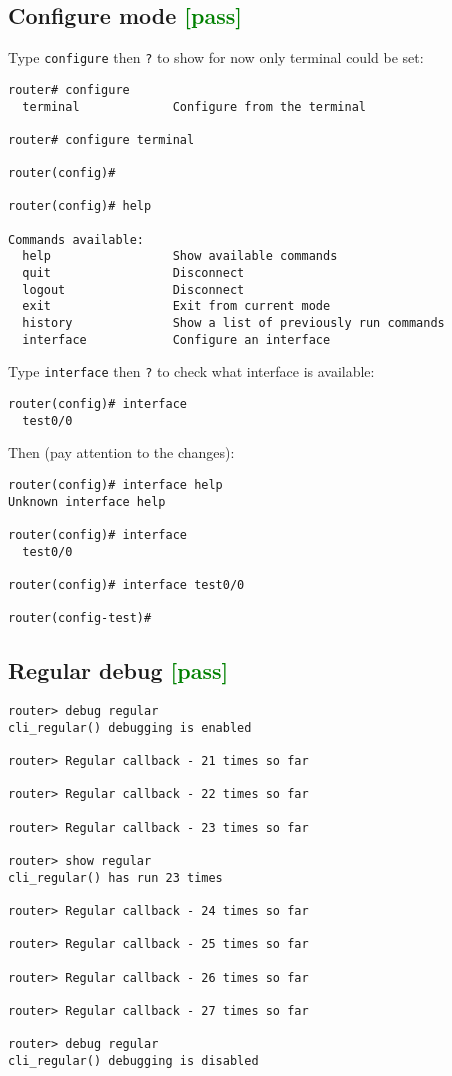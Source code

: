 \documentclass[a4paper]{report}
\begin{document}
\subsection{Configure mode \textcolor{green}{[pass]}}
Type {\tt configure} then {\tt ?} to show for now only terminal could be set:
\begin{lstlisting}
router# configure 
  terminal             Configure from the terminal

router# configure terminal

router(config)# 

router(config)# help

Commands available:
  help                 Show available commands
  quit                 Disconnect
  logout               Disconnect
  exit                 Exit from current mode
  history              Show a list of previously run commands
  interface            Configure an interface
\end{lstlisting}
Type {\tt interface} then {\tt ?} to check what interface is available:
\begin{lstlisting}
router(config)# interface 
  test0/0
\end{lstlisting}
Then (pay attention to the changes):
\begin{lstlisting}
router(config)# interface help
Unknown interface help

router(config)# interface 
  test0/0

router(config)# interface test0/0

router(config-test)# 
\end{lstlisting}
\subsection{Regular debug \textcolor{green}{[pass]}}
\begin{lstlisting}
router> debug regular
cli_regular() debugging is enabled

router> Regular callback - 21 times so far

router> Regular callback - 22 times so far

router> Regular callback - 23 times so far

router> show regular
cli_regular() has run 23 times

router> Regular callback - 24 times so far

router> Regular callback - 25 times so far

router> Regular callback - 26 times so far

router> Regular callback - 27 times so far

router> debug regular
cli_regular() debugging is disabled
\end{lstlisting}
\end{document}
